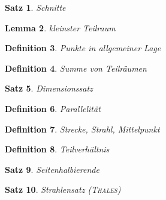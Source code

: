 \documentclass[%
a4paper,
10pt,           %
]
{scrartcl}
\theoremstyle{plain}
\newtheorem{mydef}{Definition}[section]
\theoremstyle{plain}
\newtheorem{mysatz}[mydef]{Satz}
\theoremstyle{plain}
\newtheorem{mylemma}[mydef]{Lemma}
\theoremstyle{plain}
\theoremstyle{plain}
\begin{document}
\begin{mysatz}
    Schnitte
\end{mysatz}

\begin{mylemma}
    kleinster Teilraum
\end{mylemma}

\begin{mydef}
    Punkte in allgemeiner Lage
\end{mydef}

\begin{mydef}
    Summe von Teilräumen
\end{mydef}

\begin{mysatz}
    Dimensionssatz
\end{mysatz}

\begin{mydef}
    Parallelität
\end{mydef}

\begin{mydef}
    Strecke, Strahl, Mittelpunkt
\end{mydef}

\begin{mydef}
    Teilverhältnis
\end{mydef}

\begin{mysatz}
    Seitenhalbierende
\end{mysatz}

\begin{mysatz}
    Strahlensatz (\textsc{Thales})
\end{mysatz}

\newpage
\end{document}
